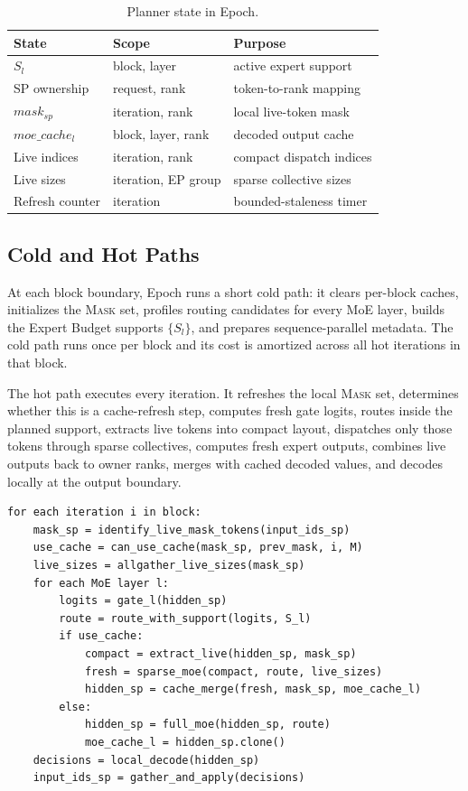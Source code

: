 \documentclass[sigconf,review,anonymous, 10pt]{acmart}
\newcommand{\sys}{Epoch}
\newcommand{\mask}{\textsc{Mask}}
\begin{document}
\begin{table}[t]
\centering
\caption{Planner state in \sys{}.}
\label{tab:planner-state}
\begin{tabular}{lll}
\toprule
State & Scope & Purpose \\
\midrule
$S_l$ & block, layer & active expert support \\
SP ownership & request, rank & token-to-rank mapping \\
$mask_{sp}$ & iteration, rank & local live-token mask \\
$moe\_cache_l$ & block, layer, rank & decoded output cache \\
Live indices & iteration, rank & compact dispatch indices \\
Live sizes & iteration, EP group & sparse collective sizes \\
Refresh counter & iteration & bounded-staleness timer \\
\bottomrule
\end{tabular}
\end{table}

\subsection{Cold and Hot Paths}

At each block boundary, \sys{} runs a short cold path: it clears per-block caches, initializes the \mask{} set, profiles routing candidates for every MoE layer, builds the Expert Budget supports $\{S_l\}$, and prepares sequence-parallel metadata.
The cold path runs once per block and its cost is amortized across all hot iterations in that block.

The hot path executes every iteration.
It refreshes the local \mask{} set, determines whether this is a cache-refresh step, computes fresh gate logits, routes inside the planned support, extracts live tokens into compact layout, dispatches only those tokens through sparse collectives, computes fresh expert outputs, combines live outputs back to owner ranks, merges with cached decoded values, and decodes locally at the output boundary.

\begin{lstlisting}[caption={Hot path for one block iteration.},label={lst:hotpath}]
for each iteration i in block:
    mask_sp = identify_live_mask_tokens(input_ids_sp)
    use_cache = can_use_cache(mask_sp, prev_mask, i, M)
    live_sizes = allgather_live_sizes(mask_sp)
    for each MoE layer l:
        logits = gate_l(hidden_sp)
        route = route_with_support(logits, S_l)
        if use_cache:
            compact = extract_live(hidden_sp, mask_sp)
            fresh = sparse_moe(compact, route, live_sizes)
            hidden_sp = cache_merge(fresh, mask_sp, moe_cache_l)
        else:
            hidden_sp = full_moe(hidden_sp, route)
            moe_cache_l = hidden_sp.clone()
    decisions = local_decode(hidden_sp)
    input_ids_sp = gather_and_apply(decisions)
\end{lstlisting}
\end{document}
